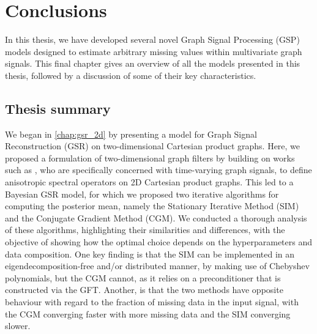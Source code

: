 \chapter{Conclusions} %

\label{chap:conclusions} %


In this thesis, we have developed several novel Graph Signal Processing (GSP) models designed to estimate arbitrary missing values within multivariate graph signals. This final chapter gives an overview of all the models presented in this thesis, followed by a discussion of some of their key characteristics.

\section{Thesis summary}

We began in \cref{chap:gsr_2d} by presenting a model for Graph Signal Reconstruction (GSR) on two-dimensional Cartesian product graphs. Here, we proposed a formulation of two-dimensional graph filters by building on works such as \cite{Ioannidis2016,Grassi2018,Isufi2017,Loukas2016}, who are specifically concerned with time-varying graph signals, to define anisotropic spectral operators on 2D Cartesian product graphs. This led to a Bayesian GSR model, for which we proposed two iterative algorithms for computing the posterior mean, namely the Stationary Iterative Method (SIM) and the Conjugate Gradient Method (CGM). We conducted a thorough analysis of these algorithms, highlighting their similarities and differences, with the objective of showing how the optimal choice depends on the hyperparameters and data composition. One key finding is that the SIM can be implemented in an eigendecomposition-free and/or distributed manner, by making use of Chebyshev polynomials, but the CGM cannot, as it relies on a preconditioner that is constructed via the GFT. Another, is that the two methods have opposite behaviour with regard to the fraction of missing data in the input signal, with the CGM converging faster with more missing data and the SIM converging slower. 

